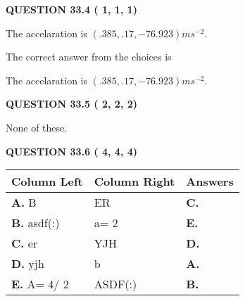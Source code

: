 \documentclass[12pt]{article}
\begin{document}
  
\vspace{0.2in}
  
{\textbf{\Large{QUESTION
33.4 
 (          1,          1,          1)
}}}
  
  


 
 
\noindent{}
 
 
The accelaration is $  %
(
.385,
.17,
-76.923)
ms^{-2} $.
 
 
 
 
 
 
\noindent{}

The correct answer from the choices is


The accelaration is $  %
(
.385,
.17,
-76.923)
ms^{-2} $.
 
 
 
  
\vspace{0.2in}
  
{\textbf{\Large{QUESTION
33.5 
 (          2,          2,          2)
}}}
  
  
 
 
\noindent{}
 
 
 None of these.
 
 
 
 
  
\vspace{0.2in}
  
{\textbf{\Large{QUESTION
33.6 
 (          4,          4,          4)
}}}
  
  
 
 
\noindent{}
  
  
\begin{tabular}{|l|l|l|}
 \hline
 Column Left & Column Right  & Answers       \\ 
 \hline
{\textbf{\large{
A.}}}
B
  & 
ER
 & 
{\textbf{\large{
C.}}}
 \\ 
 \hline
{\textbf{\large{
B.}}}
asdf(:)
  & 
 a= %
2
 & 
{\textbf{\large{
E.}}}
 \\ 
 \hline
{\textbf{\large{
C.}}}
er
  & 
YJH
 & 
{\textbf{\large{
D.}}}
 \\ 
 \hline
{\textbf{\large{
D.}}}
yjh
  & 
b
 & 
{\textbf{\large{
A.}}}
 \\ 
 \hline
{\textbf{\large{
E.}}}
 A= %
4/ %
2

  & 
ASDF(:)
 & 
{\textbf{\large{
B.}}}
 \\ 
 \hline
 \end{tabular}
  
\end{document}
